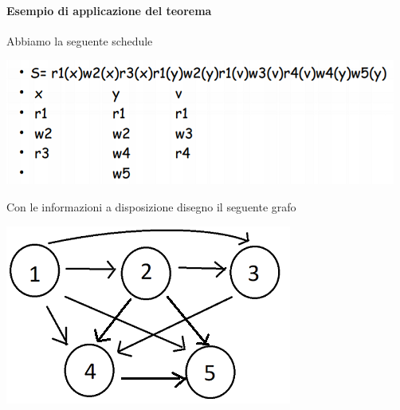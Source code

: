 \paragraph{Esempio di applicazione del teorema} Abbiamo la seguente schedule
\begin{center}\includegraphics{images/160.PNG}\end{center}
Con le informazioni a disposizione disegno il seguente grafo
\begin{center}\includegraphics{images/161.PNG}\end{center}
